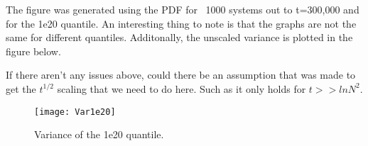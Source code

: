 \documentclass{article}
\begin{document}
The figure was generated using the PDF for ~1000 systems out to t=300,000 and for the 1e20 quantile. An interesting thing to note is that the graphs are not the same for different quantiles. Additonally, the unscaled variance is plotted in the figure below.

If there aren't any issues above, could there be an assumption that was made to get the $t^{1/2}$ scaling
that we need to do here. Such as it only holds for $t >> lnN^{2}$.

\begin{figure}[h]
\centering
\texttt{[image: Var1e20]}
\caption{Variance of the 1e20 quantile.}
\end{figure}
\end{document}
